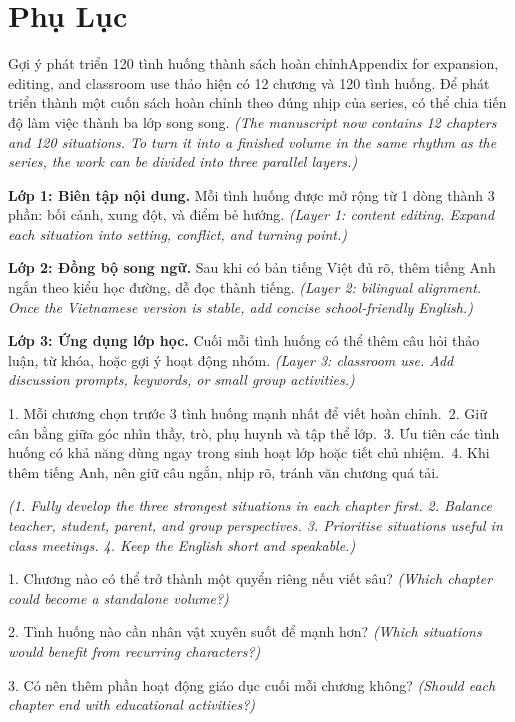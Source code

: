 \chapter*{Phụ Lục}

\begin{truyen}{Gợi ý phát triển 120 tình huống thành sách hoàn chỉnh}{Appendix for expansion, editing, and classroom use}
 thảo hiện có 12 chương và 120 tình huống. Để phát triển thành một cuốn sách hoàn chỉnh theo đúng nhịp của series, có thể chia tiến độ làm việc thành ba lớp song song.
\textit{(The manuscript now contains 12 chapters and 120 situations. To turn it into a finished volume in the same rhythm as the series, the work can be divided into three parallel layers.)}

\textbf{Lớp 1: Biên tập nội dung.} Mỗi tình huống được mở rộng từ 1 dòng thành 3 phần: bối cảnh, xung đột, và điểm bẻ hướng.
\textit{(Layer 1: content editing. Expand each situation into setting, conflict, and turning point.)}

\textbf{Lớp 2: Đồng bộ song ngữ.} Sau khi có bản tiếng Việt đủ rõ, thêm tiếng Anh ngắn theo kiểu học đường, dễ đọc thành tiếng.
\textit{(Layer 2: bilingual alignment. Once the Vietnamese version is stable, add concise school-friendly English.)}

\textbf{Lớp 3: Ứng dụng lớp học.} Cuối mỗi tình huống có thể thêm câu hỏi thảo luận, từ khóa, hoặc gợi ý hoạt động nhóm.
\textit{(Layer 3: classroom use. Add discussion prompts, keywords, or small group activities.)}
\end{truyen}

\begin{baihoc}
1. Mỗi chương chọn trước 3 tình huống mạnh nhất để viết hoàn chỉnh.\
2. Giữ cân bằng giữa góc nhìn thầy, trò, phụ huynh và tập thể lớp.\
3. Ưu tiên các tình huống có khả năng dùng ngay trong sinh hoạt lớp hoặc tiết chủ nhiệm.\
4. Khi thêm tiếng Anh, nên giữ câu ngắn, nhịp rõ, tránh văn chương quá tải.

\textit{(1. Fully develop the three strongest situations in each chapter first. 2. Balance teacher, student, parent, and group perspectives. 3. Prioritise situations useful in class meetings. 4. Keep the English short and speakable.)}
\end{baihoc}

\begin{tuhocnhanh}
1. Chương nào có thể trở thành một quyển riêng nếu viết sâu? \textit{(Which chapter could become a standalone volume?)}

2. Tình huống nào cần nhân vật xuyên suốt để mạnh hơn? \textit{(Which situations would benefit from recurring characters?)}

3. Có nên thêm phần hoạt động giáo dục cuối mỗi chương không? \textit{(Should each chapter end with educational activities?)}
\end{tuhocnhanh}

\ngancach